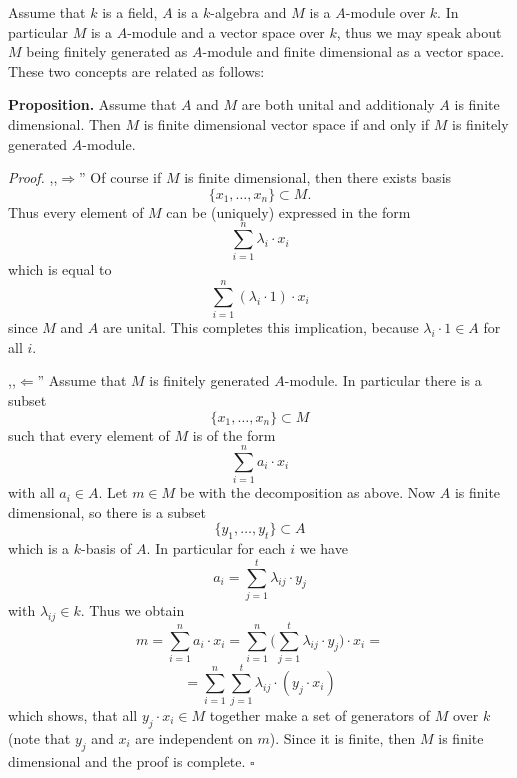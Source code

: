 \documentclass[12pt]{article}
\begin{document}
Assume that $k$ is a field, $A$ is a $k$-algebra and $M$ is a $A$-module over $k$. In particular $M$ is a $A$-module and a vector space over $k$, thus we may speak about $M$ being finitely generated as $A$-module and finite dimensional as a vector space. These two concepts are related as follows:

\textbf{Proposition.} Assume that $A$ and $M$ are both unital and additionaly $A$ is finite dimensional. Then $M$ is finite dimensional vector space if and only if $M$ is finitely generated $A$-module.

\textit{Proof.} ,,$\Rightarrow$'' Of course if $M$ is finite dimensional, then there exists basis 
$$\{x_1,\ldots,x_n\}\subset M.$$
Thus every element of $M$ can be (uniquely) expressed in the form
$$\sum_{i=1}^{n}\lambda_i\cdot x_i$$
which is equal to 
$$\sum_{i=1}^{n}(\lambda_i\cdot 1)\cdot x_i$$
since $M$ and $A$ are unital. This completes this implication, because $\lambda_i\cdot 1\in A$ for all $i$.

,,$\Leftarrow$'' Assume that $M$ is finitely generated $A$-module. In particular there is a subset 
$$\{x_1,\ldots,x_n\}\subset M$$
such that every element of $M$ is of the form
$$\sum_{i=1}^{n}a_i\cdot x_i$$
with all $a_i\in A$. Let $m\in M$ be with the decomposition as above. Now $A$ is finite dimensional, so there is a subset 
$$\{y_1,\ldots,y_t\}\subset A$$
which is a $k$-basis of $A$. In particular for each $i$ we have
$$a_i=\sum_{j=1}^{t}\lambda_{ij}\cdot y_j$$
with $\lambda_{ij}\in k$. Thus we obtain
$$m=\sum_{i=1}^{n}a_i\cdot x_i = \sum_{i=1}^{n}\big(\sum_{j=1}^{t}\lambda_{ij}\cdot y_j\big)\cdot x_i=$$
$$=\sum_{i=1}^{n}\sum_{j=1}^{t}\lambda_{ij}\cdot(y_j\cdot x_i)$$
which shows, that all $y_j\cdot x_i\in M$ together make a set of generators of $M$ over $k$ (note that $y_j$ and $x_i$ are independent on $m$). Since it is finite, then $M$ is finite dimensional and the proof is complete. $\square$
\end{document}
